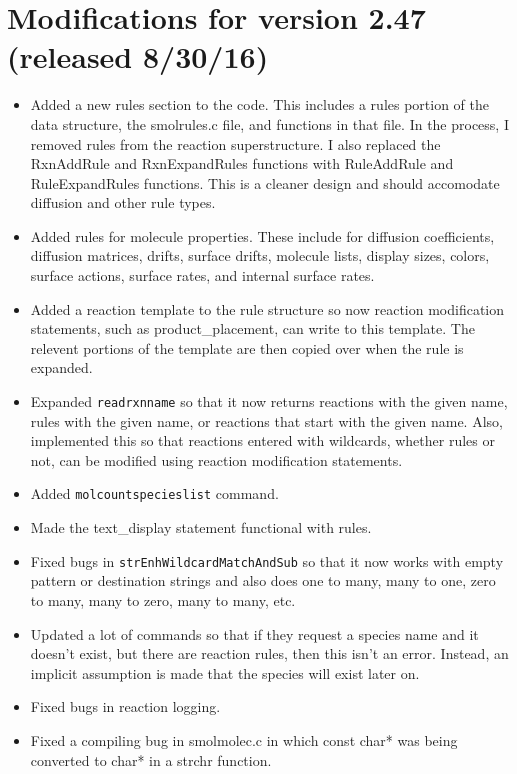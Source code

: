 \documentclass {scrbook}
\newcommand {\ttt} {\texttt}
\begin{document}
\section{Modifications for version 2.47 (released 8/30/16)}
\begin{itemize}
\item Added a new rules section to the code. This includes a rules portion of the data structure, the smolrules.c file, and functions in that file. In the process, I removed rules from the reaction superstructure. I also replaced the RxnAddRule and RxnExpandRules functions with RuleAddRule and RuleExpandRules functions. This is a cleaner design and should accomodate diffusion and other rule types.
\item Added rules for molecule properties. These include for diffusion coefficients, diffusion matrices, drifts, surface drifts, molecule lists, display sizes, colors, surface actions, surface rates, and internal surface rates.
\item Added a reaction template to the rule structure so now reaction modification statements, such as product\_placement, can write to this template. The relevent portions of the template are then copied over when the rule is expanded.
\item Expanded \ttt{readrxnname} so that it now returns reactions with the given name, rules with the given name, or reactions that start with the given name. Also, implemented this so that reactions entered with wildcards, whether rules or not, can be modified using reaction modification statements.
\item Added \ttt{molcountspecieslist} command.
\item Made the text\_display statement functional with rules.
\item Fixed bugs in \ttt{strEnhWildcardMatchAndSub} so that it now works with empty pattern or destination strings and also does one to many, many to one, zero to many, many to zero, many to many, etc.
\item Updated a lot of commands so that if they request a species name and it doesn't exist, but there are reaction rules, then this isn't an error. Instead, an implicit assumption is made that the species will exist later on.
\item Fixed bugs in reaction logging.
\item Fixed a compiling bug in smolmolec.c in which const char* was being converted to char* in a strchr function.
\end{itemize}
\end{document}
